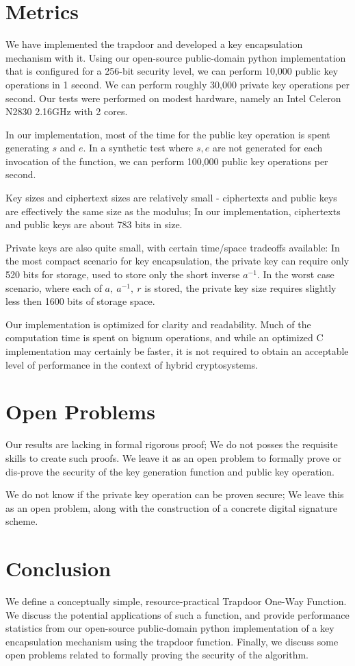 \documentclass[preprint]{iacrtrans}
\begin{document}
\section{Metrics}
We have implemented the trapdoor and developed a key encapsulation mechanism with it. Using our open-source public-domain python implementation that is configured for a 256-bit security level, we can perform 10,000 public key operations in 1 second. We can perform roughly 30,000 private key operations per second. Our tests were performed on modest hardware, namely an Intel Celeron N2830 2.16GHz with 2 cores. 

In our implementation, most of the time for the public key operation is spent generating $s$ and $e$. In a synthetic test where $s, e$ are not generated for each invocation of the function, we can perform 100,000 public key operations per second.

Key sizes and ciphertext sizes are relatively small - ciphertexts and public keys are effectively the same size as the modulus; In our implementation, ciphertexts and public keys are about 783 bits in size.

Private keys are also quite small, with certain time/space tradeoffs available: In the most compact scenario for key encapsulation, the private key can require only 520 bits for storage, used to store only the short inverse $a^{-1}$. In the worst case scenario, where each of $a,\ a^{-1},\ r$ is stored, the private key size requires slightly less then 1600 bits of storage space. 

Our implementation is optimized for clarity and readability. Much of the computation time is spent on bignum operations, and while an optimized C implementation may certainly be faster, it is not required to obtain an acceptable level of performance in the context of hybrid cryptosystems. 

\section{Open Problems}
Our results are lacking in formal rigorous proof; We do not posses the requisite skills to create such proofs. We leave it as an open problem to formally prove or dis-prove the security of the key generation function and public key operation.

We do not know if the private key operation can be proven secure; We leave this as an open problem, along with the construction of a concrete digital signature scheme.

\section{Conclusion}
We define a conceptually simple, resource-practical Trapdoor One-Way Function. We discuss the potential applications of such a function, and provide performance statistics from our open-source public-domain python implementation of a key encapsulation mechanism using the trapdoor function. Finally, we discuss some open problems related to formally proving the security of the algorithm.
\end{document}
